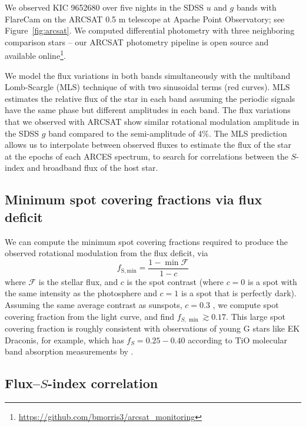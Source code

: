 We observed KIC 9652680 over five nights in the SDSS $u$ and $g$ bands with FlareCam on the ARCSAT 0.5 m telescope at Apache Point Observatory; see Figure~\ref{fig:arcsat}. We computed differential photometry with three neighboring comparison stars -- our ARCSAT photometry pipeline is open source and available online\footnote{\url{https://github.com/bmorris3/arcsat_monitoring}}. 

We model the flux variations in both bands simultaneously with the multiband Lomb-Scargle (MLS) technique of  \citet{VanderPlas2015} with two sinusoidal terms (red curves). MLS estimates the relative flux of the star in each band assuming the periodic signals have the same phase but different amplitudes in each band. The flux variations that we observed with ARCSAT show similar rotational modulation amplitude in the SDSS $g$ band compared to the \kepler semi-amplitude of 4\%. The MLS prediction allows us to interpolate between observed fluxes to estimate the flux of the star at the epochs of each ARCES spectrum, to search for correlations between the $S$-index and broadband flux of the host star. 

\subsection{Minimum spot covering fractions via flux deficit}

We can compute the minimum spot covering fractions required to produce the observed rotational modulation from the flux deficit, via
\begin{equation}
f_\mathrm{S, min} = \frac{1 - \min{\mathcal{F}}}{1-c}
\end{equation}
where $\mathcal{F}$ is the stellar flux, and $c$ is the spot contrast (where $c=0$ is a spot with the same intensity as the photosphere and $c=1$ is a spot that is perfectly dark). Assuming the same average contrast as sunspots, $c=0.3$ \citep[see e.g.][]{Morris2017a}, we compute spot covering fraction from the \kepler light curve, and find $f_{S, \min} \gtrsim 0.17$. This large spot covering fraction is roughly consistent with observations of young G stars like EK Draconis, for example, which has $f_S = 0.25-0.40$ according to TiO molecular band absorption measurements by \citet{ONeal2004}.


\subsection{Flux--$S$-index correlation}

